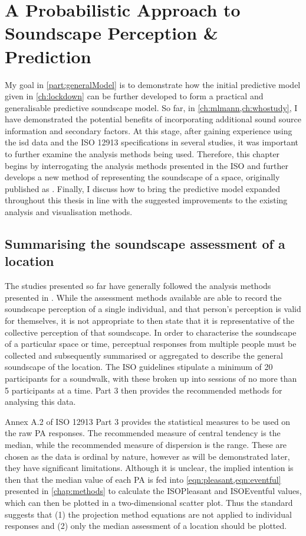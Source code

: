 \chapter{A Probabilistic Approach to Soundscape Perception \& Prediction}
\label{ch:ProbabilisticPOC}

My goal in \cref{part:generalModel} is to demonstrate how the initial predictive model given in \cref{ch:lockdown} can be further developed to form a practical and generalisable predictive soundscape model. So far, in \cref{ch:mlmann,ch:whostudy}, I have demonstrated the potential benefits of incorporating additional sound source information and secondary factors. At this stage, after gaining experience using the \gls{isd} data and the ISO 12913 specifications in several studies, it was important to further examine the analysis methods being used. Therefore, this chapter begins by interrogating the analysis methods presented in the ISO and further develops a new method of representing the soundscape of a space, originally published as \citet{Mitchell2022How}. Finally, I discuss how to bring the predictive model expanded throughout this thesis in line with the suggested improvements to the existing analysis and visualisation methods. 

\section{Summarising the soundscape assessment of a location}
The studies presented so far have generally followed the analysis methods presented in \citet{ISO12913Part3}. While the assessment methods available are able to record the soundscape perception of a single individual, and that person's perception is valid for themselves, it is not appropriate to then state that it is representative of the collective perception of that soundscape. In order to characterise the soundscape of a particular space or time, perceptual responses from multiple people must be collected and subsequently summarised or aggregated to describe the general soundscape of the location. The ISO guidelines stipulate a minimum of 20 participants for a soundwalk, with these broken up into sessions of no more than 5 participants at a time. Part 3 then provides the recommended methods for analysing this data.

Annex A.2 of ISO 12913 Part 3 provides the statistical measures to be used on the raw PA responses. The recommended measure of central tendency is the median, while the recommended measure of dispersion is the range. These are chosen as the data is ordinal by nature, however as will be demonstrated later, they have significant limitations. Although it is unclear, the implied intention is then that the median value of each PA is fed into \cref{eqn:pleasant,eqn:eventful} presented in \cref{chap:methods} to calculate the ISOPleasant and ISOEventful values, which can then be plotted in a two-dimensional scatter plot. Thus the standard suggests that (1) the projection method equations are not applied to individual responses and (2) only the median assessment of a location should be plotted.

